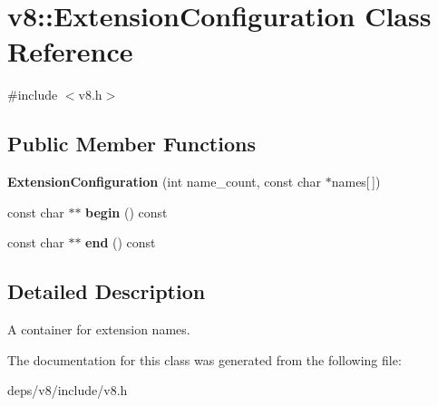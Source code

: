 \hypertarget{classv8_1_1_extension_configuration}{}\section{v8\+:\+:Extension\+Configuration Class Reference}
\label{classv8_1_1_extension_configuration}


{\ttfamily \#include $<$v8.\+h$>$}

\subsection*{Public Member Functions}
\begin{DoxyCompactItemize}
\item 
\hypertarget{classv8_1_1_extension_configuration_a1189e46efe963db4aa7340cc767f276a}{}{\bfseries Extension\+Configuration} (int name\+\_\+count, const char $\ast$names\mbox{[}$\,$\mbox{]})\label{classv8_1_1_extension_configuration_a1189e46efe963db4aa7340cc767f276a}

\item 
\hypertarget{classv8_1_1_extension_configuration_ae776fbc067a257bac854d9bcc9b72141}{}const char $\ast$$\ast$ {\bfseries begin} () const \label{classv8_1_1_extension_configuration_ae776fbc067a257bac854d9bcc9b72141}

\item 
\hypertarget{classv8_1_1_extension_configuration_abcbebcc4782016f58fc60de82f59f61a}{}const char $\ast$$\ast$ {\bfseries end} () const \label{classv8_1_1_extension_configuration_abcbebcc4782016f58fc60de82f59f61a}

\end{DoxyCompactItemize}


\subsection{Detailed Description}
A container for extension names. 

The documentation for this class was generated from the following file\+:\begin{DoxyCompactItemize}
\item 
deps/v8/include/v8.\+h\end{DoxyCompactItemize}
